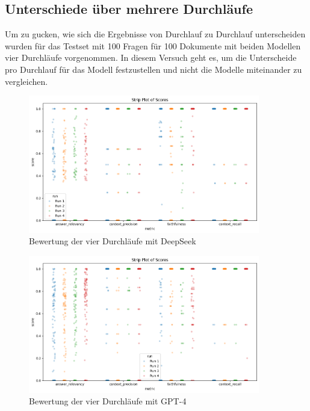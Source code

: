\subsection{Unterschiede über mehrere Durchläufe}

Um zu gucken, wie sich die Ergebnisse von Durchlauf zu Durchlauf unterscheiden wurden für das Testset mit 100 Fragen für 100 Dokumente mit beiden Modellen vier Durchläufe vorgenommen.
In diesem Versuch geht es, um die Unterscheide pro Durchlauf für das Modell festzustellen und nicht die Modelle miteinander zu vergleichen.

\begin{figure}[htbp]
    \centering
    \includegraphics[width=0.9\textwidth]{images/strip_plot_100_100_D_D.png}
    \caption{Bewertung der vier Durchläufe mit DeepSeek}
    \label{fig:sample-image}
\end{figure}

\begin{figure}[htbp]
    \centering
    \includegraphics[width=0.9\textwidth]{images/strip_plot_100_100_O_O.png}
    \caption{Bewertung der vier Durchläufe mit GPT-4}
    \label{fig:sample-image}
\end{figure}

